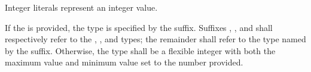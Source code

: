 \begin{grammar}
 \exactly \\
	   \\
	   \\
	   \\
	 
		 \\

 \exactly \\
	  \\

 \oneof \\
	 \\

 \exactly \\
	  \\

 \oneof \\
	 \\

 \\
	 \optional{\terminal{+}}  \\

 \oneof \\
	 \\
\end{grammar}

Integer literals represent an integer value.

\specsubitem
If the  is provided, the type is specified by the
suffix. Suffixes , ,  and  shall
respectively refer to the , , and 
types; the remainder shall refer to the type named by the suffix. Otherwise,
the type shall be a flexible integer with both the maximum value and minimum
value set to the number provided.

